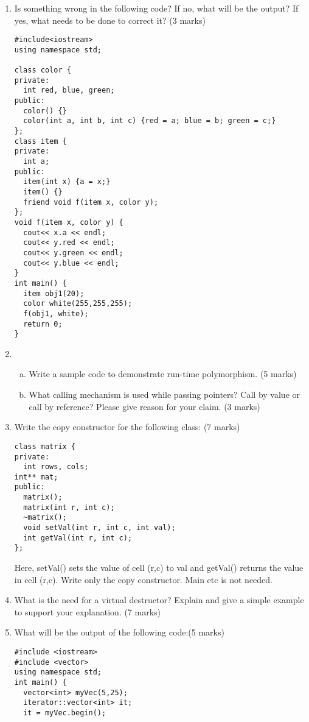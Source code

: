 \documentclass[12pt]{article}
\begin{document}
\begin{enumerate}
\item Is something wrong in the following code? If no, what will be the output? If yes, what needs to be done to correct it? (3 marks)
  \begin{lstlisting}
#include<iostream>
using namespace std;

class color {
private:
  int red, blue, green;
public:
  color() {}
  color(int a, int b, int c) {red = a; blue = b; green = c;}
};
class item {
private:
  int a;
public:
  item(int x) {a = x;}
  item() {}
  friend void f(item x, color y);
};
void f(item x, color y) {
  cout<< x.a << endl;
  cout<< y.red << endl;
  cout<< y.green << endl;
  cout<< y.blue << endl;
}
int main() {
  item obj1(20);
  color white(255,255,255);
  f(obj1, white);
  return 0;
}
  \end{lstlisting}\vspace*{70mm}
\item 
  \begin{enumerate}[a)]
  \item Write a sample code to demonstrate run-time polymorphism. (5 marks)
  \item What calling mechanism is used while passing pointers? Call by value or call by reference? Please give reason for your claim. (3 marks)
  \end{enumerate}\vspace*{130mm}
\item Write the copy constructor for the following class: (7 marks)
  \begin{lstlisting}
class matrix {
private:
  int rows, cols;
int** mat;
public:
  matrix();
  matrix(int r, int c);
  ~matrix();
  void setVal(int r, int c, int val);
  int getVal(int r, int c);
};
  \end{lstlisting}
  Here, setVal() sets the value of cell (r,c) to val and getVal() returns the value in cell (r,c). Write only the copy constructor. Main etc is not needed.\vspace*{90mm}
\item What is the need for a virtual destructor? Explain and give a simple example to support your explanation. (7 marks)
\item \vspace*{60mm}What will be the output of the following code:(5 marks)
  \begin{lstlisting}
#include <iostream>
#include <vector>
using namespace std;
int main() {
  vector<int> myVec(5,25);
  iterator::vector<int> it;
  it = myVec.begin();

\end{lstlisting}
\end{enumerate}
\end{document}
